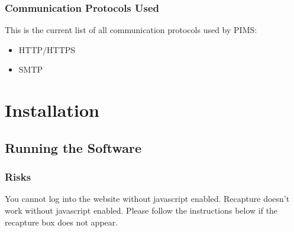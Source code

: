 \documentclass[14pt, a4paper]{article}
\begin{document}
\subsubsection{Communication Protocols Used}
This is the current list of all communication protocols used by PIMS:
\begin{itemize}
	\item HTTP/HTTPS
	\item SMTP
\end{itemize}
\newpage

\newpage

\section{Installation}
\subsection{Running the Software}
\subsubsection{Risks}
You cannot log into the website without javascript enabled. Recapture doesn't work without javascript enabled.
Please follow the instructions below if the recapture box does not appear.
\end{document}
